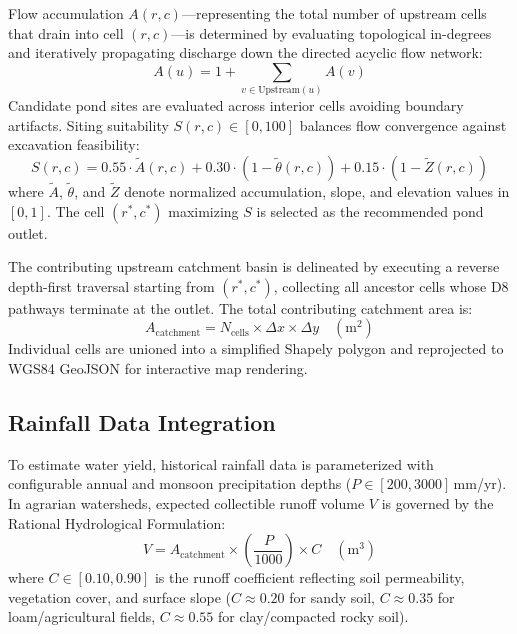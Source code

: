\documentclass[manuscript,screen,review]{acmart}
\begin{document}
Flow accumulation $A(r, c)$---representing the total number of upstream cells that drain into cell $(r, c)$---is determined by evaluating topological in-degrees and iteratively propagating discharge down the directed acyclic flow network:
\begin{equation}
A(u) = 1 + \sum_{v \in \text{Upstream}(u)} A(v)
\end{equation}
Candidate pond sites are evaluated across interior cells avoiding boundary artifacts. Siting suitability $S(r, c) \in [0, 100]$ balances flow convergence against excavation feasibility:
\begin{equation}
S(r, c) = 0.55 \cdot \widetilde{A}(r, c) + 0.30 \cdot (1 - \widetilde{\theta}(r, c)) + 0.15 \cdot (1 - \widetilde{Z}(r, c))
\end{equation}
where $\widetilde{A}$, $\widetilde{\theta}$, and $\widetilde{Z}$ denote normalized accumulation, slope, and elevation values in $[0, 1]$. The cell $(r^*, c^*)$ maximizing $S$ is selected as the recommended pond outlet.

The contributing upstream catchment basin is delineated by executing a reverse depth-first traversal starting from $(r^*, c^*)$, collecting all ancestor cells whose D8 pathways terminate at the outlet. The total contributing catchment area is:
\begin{equation}
A_{\text{catchment}} = N_{\text{cells}} \times \Delta x \times \Delta y \quad (\text{m}^2)
\end{equation}
Individual cells are unioned into a simplified Shapely polygon and reprojected to WGS84 GeoJSON for interactive map rendering.

\subsection{Rainfall Data Integration}
To estimate water yield, historical rainfall data is parameterized with configurable annual and monsoon precipitation depths ($P \in [200, 3000]$\,mm/yr). In agrarian watersheds, expected collectible runoff volume $V$ is governed by the Rational Hydrological Formulation:
\begin{equation}
V = A_{\text{catchment}} \times \left( \frac{P}{1000} \right) \times C \quad (\text{m}^3)
\end{equation}
where $C \in [0.10, 0.90]$ is the runoff coefficient reflecting soil permeability, vegetation cover, and surface slope ($C \approx 0.20$ for sandy soil, $C \approx 0.35$ for loam/agricultural fields, $C \approx 0.55$ for clay/compacted rocky soil).
\end{document}
